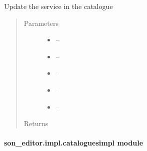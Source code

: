 \documentclass[letterpaper,10pt,english]{sphinxmanual}
\begin{document}

\begin{fulllineitems}
\label{_source/son_editor.impl:son_editor.impl.catalogue_servicesimpl.update_service_catalogue}
Update the service in the catalogue
\begin{quote}\begin{description}
\item[{Parameters}] \leavevmode\begin{itemize}
\item {} 
 -- 

\item {} 
 -- 

\item {} 
 -- 

\item {} 
 -- 

\item {} 
 -- 

\end{itemize}

\item[{Returns}] \leavevmode


\end{description}\end{quote}

\end{fulllineitems}



\paragraph{son\_editor.impl.cataloguesimpl module}
\label{_source/son_editor.impl:module-son_editor.impl.cataloguesimpl}\label{_source/son_editor.impl:son-editor-impl-cataloguesimpl-module}
\end{document}
